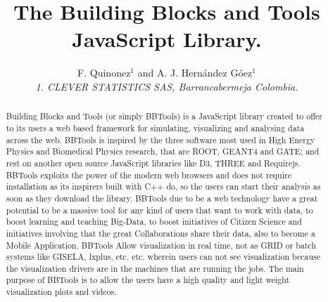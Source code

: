 \documentclass[12pt,twoside,a4paper]{article}
\begin{document}
\title{\color{blue}The Building Blocks and Tools JavaScript Library.}
\author{F. Quinonez$^{1}$ and A. J. Hern\'{a}ndez G\'{o}ez$^{1}$\\
  \small{\em{1. CLEVER STATISTICS SAS, Barrancabermeja Colombia.}}
}
\maketitle
\begin{abstract}
Building Blocks and Tools (or simply BBTools) is a JavaScript library created 
to offer to its users a web based framework for si\-mu\-la\-ting, visualizing and analysing 
data across the web. BBTools is inspired by the three software most used in 
High Energy Physics and Biomedical Physics research, that are ROOT, GEANT4 and GATE; and rest
on another open source JavaScript libraries like D3, THREE and Requirejs. 
BBTools exploits the power of the modern web browsers and does not require installation as
its inspirers built with C++ do, so the users can start their analysis as soon as they download the library. 
BBTools due to be a web technology have a great potential to be a massive tool for any kind of users that want to work with data,
to boost learning and teaching Big-Data, to boost initiatives of Citizen Science and initiatives involving that the great Collaborations share their data, also to become a Mobile Application. 
BBTools Allow visualization in real time, not as GRID or batch systems like GISELA, lxplus, etc. etc. 
wherein users can not see visualization because the visualization
drivers are in the machines that are running the jobs. The main purpose of BBTools is to allow the users have a high quality and light weight visualization
plots and videos.
\end{abstract}
\end{document}
